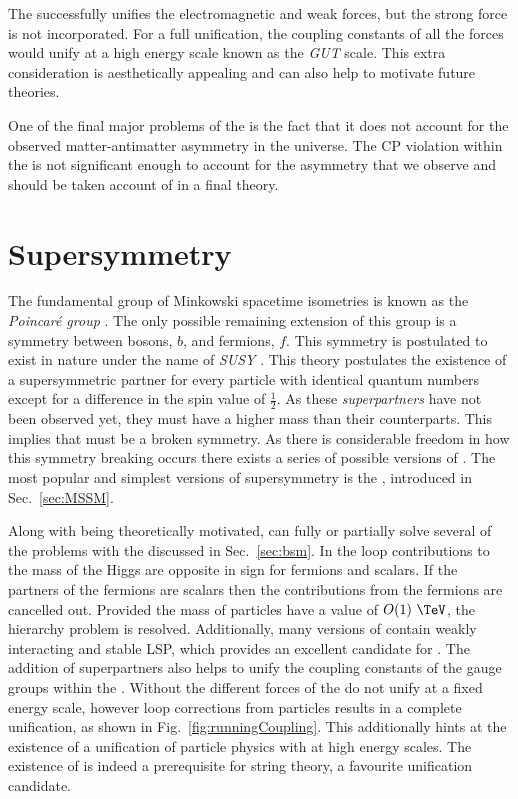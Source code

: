 The \SM successfully unifies the electromagnetic and weak forces, but
the strong force is not incorporated. For a full unification, the
coupling constants of all the \SM forces would unify at a high energy
scale known as the \emph{GUT} scale. This extra consideration is
aesthetically appealing and can also help to motivate future \BSM
theories.

One of the final major problems of the \SM is the fact that it does
not account for the observed matter-antimatter asymmetry in the
universe. The \ac{CP} violation within the \SM is not significant
enough to account for the asymmetry that we observe and should be taken
account of in a final \BSM theory.

\section{Supersymmetry}
\label{sec:susy}

The fundamental group of Minkowski spacetime isometries is known as
the \emph{Poincar\'e group} \cite{Poincare1906}. The only possible
remaining extension of this group is a symmetry between bosons, $b$,
and fermions, $f$. This symmetry is postulated to exist in nature
under the name of \emph{\acf{SUSY}} \cite{Martin:1997ns}. This theory
postulates the existence of a supersymmetric partner for every \SM
particle with identical quantum numbers except for a difference in the
spin value of $\frac{1}{2}$. As these \emph{superpartners} have not been
observed yet, they must have a higher mass than their \SM
counterparts. This implies that \SUSY must be a broken symmetry. As
there is considerable freedom in how this symmetry breaking occurs
there exists a series of possible versions of \SUSY. The most popular
and simplest versions of supersymmetry is the \MSSM, introduced in
Sec.~\ref{sec:MSSM}.

Along with being theoretically motivated, \SUSY can fully or partially
solve several of the problems with the \SM discussed in
Sec.~\ref{sec:bsm}. In \SUSY the loop contributions to the mass of the
Higgs are opposite in sign for fermions and scalars. If the partners
of the \SM fermions are \SUSY scalars then the contributions from the
\SM fermions are cancelled out. Provided the mass of \SUSY particles
have a value of $O(1)~\tev$, the hierarchy problem is resolved.
Additionally, many versions of \SUSY contain weakly interacting and
stable \acf{LSP}, which provides an excellent candidate for \DM. The
addition of superpartners also helps to unify the coupling constants
of the gauge groups within the \SM. Without \SUSY the different forces
of the \SM do not unify at a fixed energy scale, however loop
corrections from \SUSY particles results in a complete unification, as
shown in Fig.~\ref{fig:runningCoupling}. This additionally hints at
the existence of a unification of particle physics with \GR at high energy scales.
The existence of \SUSY is indeed a prerequisite for string theory, a
favourite unification candidate.

